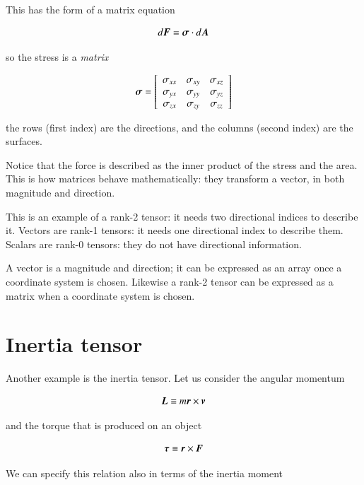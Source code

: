 This has the form of a matrix equation  


\begin{equation}
d{\boldsymbol{F}} = \boldsymbol{\mathrm{\sigma}} \cdot d{\boldsymbol{A}}
\end{equation}


\noindent so the stress is a {\it matrix}


\begin{equation}
\boldsymbol{\mathrm{\sigma}} = \left[\begin{array}{ccc}
\sigma_{xx} & \sigma_{xy} & \sigma_{xz} \\
\sigma_{yx} & \sigma_{yy} & \sigma_{yz} \\
\sigma_{zx} & \sigma_{zy} & \sigma_{zz} 
\end{array}\right] 
\end{equation}


\noindent the rows (first index) are the directions, and the columns (second index) are the surfaces. 

Notice that the force is described as the inner product of the stress and the area. This is how matrices behave mathematically: they transform a vector, in both magnitude and direction. 

This is an example of a rank-2 tensor: it needs two directional indices to describe it. Vectors are rank-1 tensors: it needs one directional index to describe them. Scalars are rank-0 tensors: they do not have directional information. 

A vector is a magnitude and direction; it can be expressed as an array once a coordinate system is chosen. Likewise a rank-2 tensor can be expressed as a matrix when a coordinate system is chosen.


\section{Inertia tensor}

Another example is the inertia tensor. Let us consider the angular momentum 

\begin{equation}
{\boldsymbol{L}} \equiv m {\boldsymbol{r}} \times {\boldsymbol{v}}  
\end{equation}


\noindent and the torque that is produced on an object 

\begin{equation}
{\boldsymbol{\tau}} \equiv {\boldsymbol{r}} \times {\boldsymbol{F}}  
\end{equation}

We can specify this relation also in terms of the inertia moment

